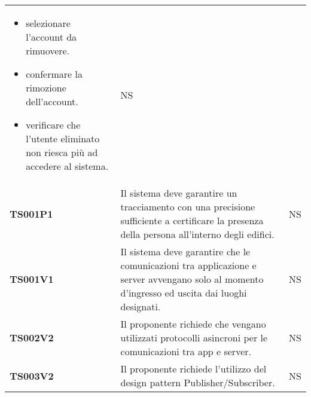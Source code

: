 \documentclass[../piano-di-qualifica.tex]{subfiles}
\begin{document}
\begin{longtable}[H]{>{\centering\bfseries}m{3cm} >{}m{10cm} >{\centering\arraybackslash}m{3cm}}
\begin{itemize}
    \item selezionare l'account da rimuovere.
    \item confermare la rimozione dell'account.
    \item verificare che l'utente eliminato non riesca più ad accedere al sistema.
  \end{itemize}
                     & NS                                                                                                                                                                                                                                                               \\


  TS001P1            & Il sistema deve garantire un tracciamento con una precisione sufficiente a certificare la presenza della persona all’interno degli edifici.
                     & NS                                                                                                                                                                                                                                                               \\

  TS001V1            & Il sistema deve garantire che le comunicazioni tra applicazione e server avvengano solo al momento d’ingresso ed uscita dai luoghi designati.
                     & NS                                                                                                                                                                                                                                                               \\

  TS002V2            & Il proponente richiede che vengano utilizzati protocolli asincroni per le comunicazioni tra app e server.
                     & NS                                                                                                                                                                                                                                                               \\

  TS003V2            & Il proponente richiede l’utilizzo del design pattern Publisher/Subscriber.
                     & NS                                                                                                                                                                                                                                                               \\


\end{longtable}
\end{document}
